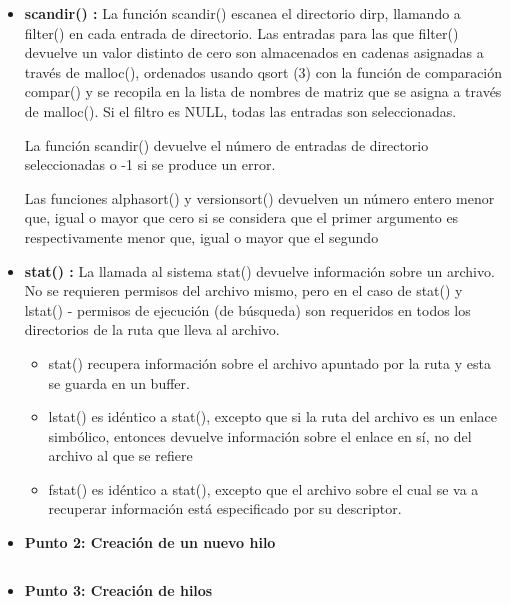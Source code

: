 \documentclass[12pt]{article}
\begin{document}
\begin{itemize}
             \item[\Checkmark] \textbf{scandir() :}
             La función scandir() escanea el directorio dirp, llamando a filter() en cada entrada de directorio. Las entradas para las que filter() devuelve un valor distinto de cero son almacenados en cadenas asignadas a través de malloc(), ordenados usando qsort (3) con la función de comparación compar() y se recopila en la lista de nombres de matriz que se asigna a través de malloc(). Si el filtro es NULL, todas las entradas son seleccionadas.
             
             La función scandir() devuelve el número de entradas de directorio seleccionadas o -1 si se produce un error.

            Las funciones alphasort() y versionsort() devuelven un número entero menor que, igual o mayor que cero si se considera que el primer argumento es respectivamente menor que, igual o mayor que el segundo
             
             \item[\checkmark] \textbf{stat() :}
             La llamada al sistema stat() devuelve información sobre un archivo. No se requieren permisos del archivo mismo, pero en el caso de stat() y lstat() - permisos de ejecución (de búsqueda) son requeridos en todos los directorios de la ruta que lleva al archivo.
                \begin{itemize}
                    \item stat() recupera información sobre el archivo apuntado por la ruta y esta se guarda en un buffer.

                    \item lstat() es idéntico a stat(), excepto que si la ruta del archivo es un enlace simbólico, entonces devuelve información sobre el enlace en sí, no del archivo al que se refiere

                    \item fstat() es idéntico a stat(), excepto que el archivo sobre el cual se va a recuperar información está especificado por su descriptor.
                \end{itemize}
        
        \end{itemize}
        
        \begin{itemize}
            \item[\Checkmark] \textbf{Punto 2: Creación de un nuevo hilo} 
            \inputminted{c++}{Code/Linux/2.c}
            \newpage
            \item[\Checkmark] \textbf{Punto 3: Creación de hilos} 
            \inputminted{c++}{Code/Linux/3.c}
        \end{itemize}
        
\end{document}
